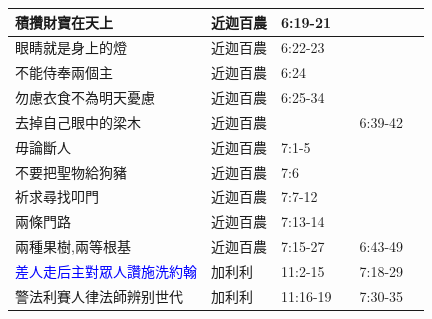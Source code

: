 \begin{table}[H]
\begin{tabular}{p{13.07em}|p{8.43em}|p{5.285em}|p{5.57em}|p{5.285em}|p{4.855em}}
積攢財寶在天上& 近迦百農  & 6:19-21& \multicolumn{1}{r|}{} & \multicolumn{1}{r|}{} & \multicolumn{1}{r}{} \\    \midrule
眼睛就是身上的燈& 近迦百農  & 6:22-23 & \multicolumn{1}{r|}{} & \multicolumn{1}{r|}{} & \multicolumn{1}{r}{} \\    \midrule
不能侍奉兩個主& 近迦百農  & 6:24 & \multicolumn{1}{r|}{} & \multicolumn{1}{r|}{} & \multicolumn{1}{r}{} \\    \midrule
勿慮衣食不為明天憂慮& 近迦百農  & 6:25-34 & \multicolumn{1}{r|}{} & \multicolumn{1}{r|}{} & \multicolumn{1}{r}{} \\    \midrule

去掉自己眼中的梁木& 近迦百農  &  & \multicolumn{1}{r|}{} & \multicolumn{1}{l|}{6:39-42} & \multicolumn{1}{r}{} \\    \midrule

毋論斷人& 近迦百農  & 7:1-5 & \multicolumn{1}{r|}{} & \multicolumn{1}{r|}{} & \multicolumn{1}{r}{} \\    \midrule
不要把聖物給狗豬& 近迦百農  & 7:6 & \multicolumn{1}{r|}{} & \multicolumn{1}{r|}{} & \multicolumn{1}{r}{} \\    \midrule
祈求尋找叩門& 近迦百農  & 7:7-12 & \multicolumn{1}{r|}{} & \multicolumn{1}{r|}{} & \multicolumn{1}{r}{} \\    \midrule
兩條門路& 近迦百農  & 7:13-14 & \multicolumn{1}{r|}{} & \multicolumn{1}{r|}{} & \multicolumn{1}{r}{} \\    \midrule
兩種果樹,兩等根基& 近迦百農  & 7:15-27 & \multicolumn{1}{r|}{} & \multicolumn{1}{l|}{6:43-49} & \multicolumn{1}{r}{} \\    \midrule

\textcolor{blue}{差人走后主對眾人讚施洗約翰}& 加利利   & 11:2-15& \multicolumn{1}{r|}{} & 7:18-29& \multicolumn{1}{r}{} \\ \midrule

警法利賽人律法師辨别世代& 加利利   & 11:16-19& \multicolumn{1}{r|}{} & 7:30-35& \multicolumn{1}{r}{} \\ \midrule

\end{tabular}%
\end{table}%


